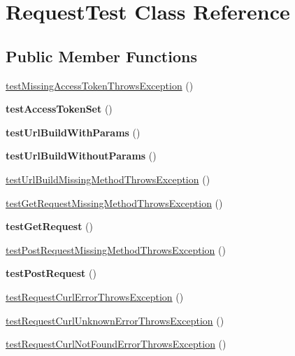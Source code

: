\hypertarget{classRequestTest}{
\section{RequestTest Class Reference}
\label{classRequestTest}
}
\subsection*{Public Member Functions}
\begin{DoxyCompactItemize}
\item 
\hyperlink{classRequestTest_a94778dc2c6b1a05166604289a01ef918}{testMissingAccessTokenThrowsException} ()
\item 
\hypertarget{classRequestTest_ae2603c78c05743059ec4b75590827e16}{
{\bfseries testAccessTokenSet} ()}
\label{classRequestTest_ae2603c78c05743059ec4b75590827e16}

\item 
\hypertarget{classRequestTest_a3c39d6731b4aaa16ef319c1355d7a900}{
{\bfseries testUrlBuildWithParams} ()}
\label{classRequestTest_a3c39d6731b4aaa16ef319c1355d7a900}

\item 
\hypertarget{classRequestTest_a03bedad48828dadfb54885c9d2cd5b2d}{
{\bfseries testUrlBuildWithoutParams} ()}
\label{classRequestTest_a03bedad48828dadfb54885c9d2cd5b2d}

\item 
\hyperlink{classRequestTest_a02546fc31efd91f7073605417343ae48}{testUrlBuildMissingMethodThrowsException} ()
\item 
\hyperlink{classRequestTest_ac564f79430de3857c4215fe4a966888f}{testGetRequestMissingMethodThrowsException} ()
\item 
\hypertarget{classRequestTest_ab16e5c2d07a157f5a19ae51cc5481808}{
{\bfseries testGetRequest} ()}
\label{classRequestTest_ab16e5c2d07a157f5a19ae51cc5481808}

\item 
\hyperlink{classRequestTest_a9ea34bc4bf4394c214013d651e819ef2}{testPostRequestMissingMethodThrowsException} ()
\item 
\hypertarget{classRequestTest_aeaefb39476daee3834741c82000a06bf}{
{\bfseries testPostRequest} ()}
\label{classRequestTest_aeaefb39476daee3834741c82000a06bf}

\item 
\hyperlink{classRequestTest_af908eba074694d3a67e8a7eeb41acd89}{testRequestCurlErrorThrowsException} ()
\item 
\hyperlink{classRequestTest_a46510f5d63d45a981fe05c34e569a7cb}{testRequestCurlUnknownErrorThrowsException} ()
\item 
\hyperlink{classRequestTest_a89d8d17dd32d36a81927903c2315614a}{testRequestCurlNotFoundErrorThrowsException} ()
\end{DoxyCompactItemize}
